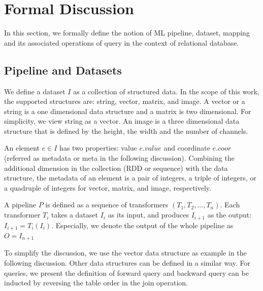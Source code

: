 \documentclass{sig-alternate}
\begin{document}
\section{Formal Discussion}
\label{sec:Mapping}
In this section, we formally define the notion of ML pipeline, dataset, mapping and its associated operations of query in the context of 
relational database.

\subsection{Pipeline and Datasets}
\label{sec:Map-Pipe-Data}
We define a dataset $I$ as a collection of structured data. In the scope of this work, the supported structures are: 
string, vector, matrix, and image. A vector or a string is a one dimensional data structure and a matrix is two dimensional. 
For simplicity, we view string as a vector.
An image is a three dimensional data structure that is defined by the height, the width and the number
of channels. 

An element $e \in I$ has two properties: value $e.value$ and coordinate $e.coor$ (referred as metadata or meta
in the following discussion). 
Combining the additional dimension in the collection (RDD or sequence) with the data structure, 
the metadata of an element is a pair of integers, a triple of integers, or a quadruple of integers
for vector, matrix, and image, respectively.

A pipeline $P$ is defined as a sequence of transformers $(T_1, T_2, ..., T_n)$. 
Each transformer $T_i$ takes a dataset $I_i$ as its input, and produces $I_{i+1}$ as the output: 
$I_{i+1} = T_i(I_i)$. 
Especially, we denote the output of the whole pipeline as $O = I_{n+1}$

To simplify the discussion, we use the vector data structure as example in the following discussion.
Other data structures can be defined in a similar way. 
For queries, we present the definition of forward query and backward query can be inducted by reversing
the table order in the join operation.
\end{document}
